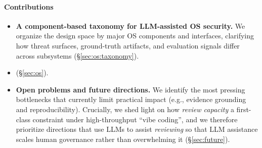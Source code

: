 \paragraph*{\textbf{Contributions}} 
\begin{itemize}
  \item \textbf{A component-based taxonomy for LLM-assisted OS security.} 
  We organize the design space by major OS components and interfaces, clarifying how threat surfaces, ground-truth artifacts, and evaluation signals differ across subsystems (\S\ref{sec:os:taxonomy}).

  \item \textbf{}
   (\S\ref{sec:os}).
  
  \item \textbf{Open problems and future directions.} 
  We identify the most pressing bottlenecks that currently limit practical impact (e.g., evidence grounding and reproducibility). 
  Crucially, we shed light on how \textit{review capacity}  a first-class constraint under high-throughput ``vibe coding'', and we therefore prioritize directions that use LLMs to assist \textit{reviewing} so that LLM assistance scales human governance rather than overwhelming it (\S\ref{sec:future}).
\end{itemize}
